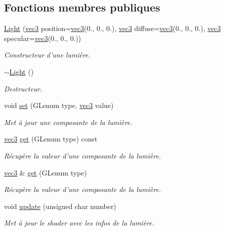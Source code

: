 \subsection*{Fonctions membres publiques}
\begin{DoxyCompactItemize}
\item 
\hyperlink{class_light_aa7bcc37dee068f7266f86e07a3dfe4f0}{Light} (\hyperlink{structvec3}{vec3} position=\hyperlink{structvec3}{vec3}(0., 0., 0.), \hyperlink{structvec3}{vec3} diffuse=\hyperlink{structvec3}{vec3}(0., 0., 0.), \hyperlink{structvec3}{vec3} specular=\hyperlink{structvec3}{vec3}(0., 0., 0.))
\begin{DoxyCompactList}\small\item\em Constructeur d'une lumière. \end{DoxyCompactList}\item 
\hyperlink{class_light_ad0e59fad13bb6cfadc25b2c477e9ddc7}{$\sim$\+Light} ()
\begin{DoxyCompactList}\small\item\em Destructeur. \end{DoxyCompactList}\item 
void \hyperlink{class_light_a9fcc4b3ffdeedbe214ee8384c7d311b9}{set} (G\+Lenum type, \hyperlink{structvec3}{vec3} value)
\begin{DoxyCompactList}\small\item\em Met à jour une composante de la lumière. \end{DoxyCompactList}\item 
\hyperlink{structvec3}{vec3} \hyperlink{class_light_ad0f5f939bc047e39c6deb2e264a5a2c1}{get} (G\+Lenum type) const 
\begin{DoxyCompactList}\small\item\em Récupère la valeur d'une composante de la lumière. \end{DoxyCompactList}\item 
\hyperlink{structvec3}{vec3} \& \hyperlink{class_light_a74a0381255c1c7e002ac583401a46de0}{get} (G\+Lenum type)
\begin{DoxyCompactList}\small\item\em Récupère la valeur d'une composante de la lumière. \end{DoxyCompactList}\item 
void \hyperlink{class_light_ade4c742c8ca2c014d74c659fa615ffd7}{update} (unsigned char number)
\begin{DoxyCompactList}\small\item\em Met à jour le shader avec les infos de la lumière. \end{DoxyCompactList}\end{DoxyCompactItemize}
